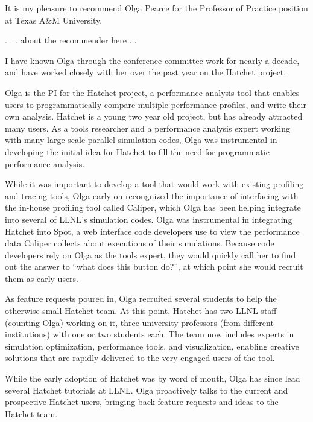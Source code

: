 \documentclass[11pt]{article}
\begin{document}
It is my pleasure to recommend Olga Pearce for the Professor of Practice position at Texas A\&M University.

. . . about the recommender here ...

I have known Olga through the conference committee work for nearly a decade, and have worked closely with her over the past year on the Hatchet project.

Olga is the PI for the Hatchet project, a performance analysis tool that enables users to programmatically compare multiple performance profiles, and write their own analysis.
Hatchet is a young two year old project, but has already attracted many users.
As a tools researcher and a performance analysis expert working with many large scale parallel simulation codes,
Olga was instrumental in developing the initial idea for Hatchet to fill the need for programmatic performance analysis.

While it was important to develop a tool that would work with existing profiling and tracing tools,
Olga early on recongnized the importance of interfacing with the in-house profiling tool called Caliper,
which Olga has been helping integrate into several of LLNL's simulation codes.
Olga was instrumental in integrating Hatchet into Spot,
a web interface code developers use to view the performance data Caliper collects about
executions of their simulations.
Because code developers rely on Olga as the tools expert,
they would quickly call her to find out the answer to
``what does this button do?'', at which point she would recruit them
as early users.

As feature requests poured in, Olga recruited several students
to help the otherwise small Hatchet team.
At this point, Hatchet has two LLNL staff (counting Olga) working on it,
three university professors (from different institutions)
with one or two students each.
The team now includes experts in simulation optimization, performance tools,
and visualization, enabling creative solutions that are
rapidly delivered to the very engaged users of the tool.

While the early adoption of Hatchet was by word of mouth,
Olga has since lead several Hatchet tutorials at LLNL.
Olga proactively talks to the current and prospective Hatchet users,
bringing back feature requests and ideas to the Hatchet team.


%
%
\end{document}
